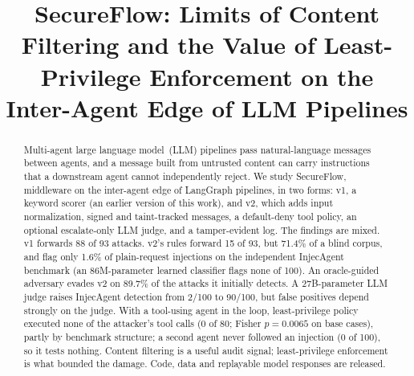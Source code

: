 \documentclass[conference]{IEEEtran}
\newif\ifanon
\newcommand{\ourfirst}{an earlier version of this work}
\newcommand{\ourfirst}{our first manuscript}
\begin{document}
\title{SecureFlow: Limits of Content Filtering and the Value of
Least-Privilege Enforcement on the Inter-Agent Edge of LLM Pipelines}

\ifanon
\author{\IEEEauthorblockN{Anonymous Authors}
\IEEEauthorblockA{\textit{Anonymous Institution}}}
\else
\author{%
  \and
  \and
}
\fi

\maketitle

\begin{abstract}
Multi-agent large language model~(LLM) pipelines pass natural-language messages
between agents, and a message built from untrusted content can carry instructions
that a downstream agent cannot independently reject. We study SecureFlow, middleware
on the inter-agent edge of LangGraph pipelines, in two forms: v1, a keyword scorer
(\ourfirst), and v2, which adds input normalization, signed and taint-tracked
messages, a default-deny tool policy, an optional escalate-only LLM judge, and a
tamper-evident log. The findings are mixed. v1 forwards 88 of 93 attacks. v2's rules
forward 15 of 93, but 71.4\% of a blind corpus, and flag only 1.6\% of plain-request
injections on the independent InjecAgent benchmark (an 86M-parameter learned
classifier flags none of 100). An oracle-guided adversary evades v2 on 89.7\% of the
attacks it initially detects. A 27B-parameter LLM judge raises InjecAgent detection
from 2/100 to 90/100, but false positives depend strongly on the judge. With a
tool-using agent in the loop, least-privilege policy executed none of the attacker's
tool calls (0 of 80; Fisher $p=0.0065$ on base cases), partly by benchmark structure;
a second agent never followed an injection (0 of 100), so it tests nothing. Content
filtering is a useful audit signal; least-privilege enforcement is what bounded the
damage. Code, data and replayable model responses are released.
\end{abstract}
\end{document}
